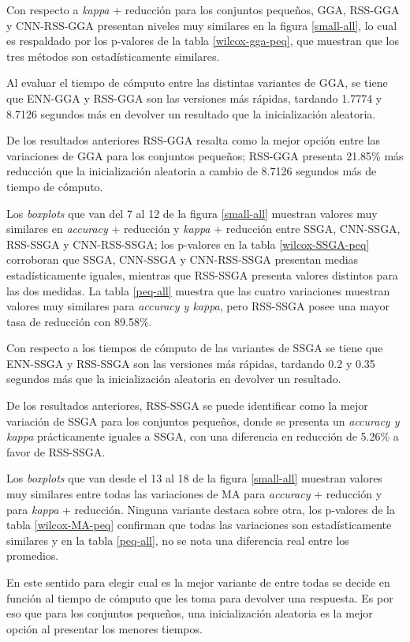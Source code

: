 Con respecto a \emph{kappa} + reducción para los conjuntos pequeños, GGA, RSS-GGA y CNN-RSS-GGA presentan niveles muy similares en la figura \ref{small-all}, lo cual es respaldado por los p-valores de la tabla \ref{wilcox-gga-peq}, que muestran que los tres métodos son estadísticamente similares.

Al evaluar el tiempo de cómputo entre las distintas variantes de GGA, se tiene que ENN-GGA y RSS-GGA son las versiones más rápidas, tardando 1.7774 y 8.7126 segundos más en devolver un resultado que la inicialización aleatoria. 

De los resultados anteriores RSS-GGA resalta como la mejor opción entre las variaciones de GGA para los conjuntos pequeños; RSS-GGA presenta 21.85\% más reducción que la inicialización aleatoria a cambio de 8.7126 segundos más de tiempo de cómputo.

Los \emph{boxplots} que van del 7 al 12 de la figura \ref{small-all} muestran valores muy similares en \emph{accuracy} + reducción y \emph{kappa} + reducción entre SSGA, CNN-SSGA, RSS-SSGA y CNN-RSS-SSGA; los p-valores en la tabla \ref{wilcox-SSGA-peq} corroboran que SSGA, CNN-SSGA y CNN-RSS-SSGA presentan medias estadísticamente iguales, mientras que RSS-SSGA presenta valores distintos para las dos medidas. La tabla \ref{peq-all} muestra que las cuatro variaciones muestran valores muy similares para \emph{accuracy y kappa}, pero RSS-SSGA posee una mayor tasa de reducción con 89.58\%.   

Con respecto a los tiempos de cómputo de las variantes de SSGA se tiene que ENN-SSGA y RSS-SSGA son las versiones más rápidas, tardando 0.2 y 0.35 segundos más que la inicialización aleatoria en devolver un resultado.

De los resultados anteriores, RSS-SSGA se puede identificar como la mejor variación de SSGA para los conjuntos pequeños, donde se presenta un \emph{accuracy y kappa} prácticamente iguales a SSGA, con una diferencia en reducción de 5.26\% a favor de RSS-SSGA.

Los \emph{boxplots} que van desde el 13 al 18 de la figura \ref{small-all} muestran valores muy similares entre todas las variaciones de MA para \emph{accuracy} + reducción y para \emph{kappa} + reducción. Ninguna variante destaca sobre otra, los p-valores de la tabla \ref{wilcox-MA-peq} confirman que todas las variaciones son estadísticamente similares y en la tabla \ref{peq-all}, no se nota una diferencia real entre los promedios.

En este sentido para elegir cual es la mejor variante de entre todas se decide en función al tiempo de cómputo que les toma para devolver una respuesta. Es por eso que para los conjuntos pequeños, una inicialización aleatoria es la mejor opción al presentar los menores tiempos.

